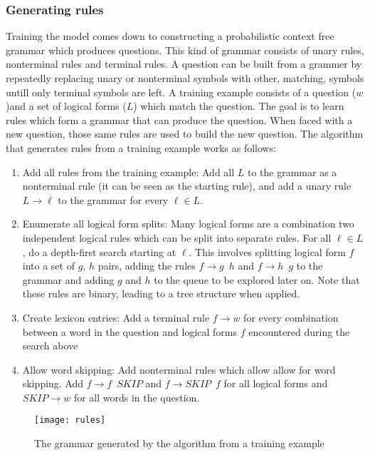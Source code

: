 \subsubsection{Generating rules}
Training the model comes down to constructing a probabilistic context free grammar which produces questions. This kind of grammar consists of unary rules, nonterminal rules and terminal rules. A question can be built from a grammer by repeatedly replacing unary or nonterminal symbols with other, matching, symbols untill only terminal symbols are left. A training example consists of a question ($w$)and a set of logical forms ($L$) which match the question. The goal is to learn rules which form a grammar that can produce the question. When faced with a new question, those same rules are used to build the new question. The algorithm that generates rules from a training example works as follows:
\begin{enumerate}
\item Add all rules from the training example: Add all $L$ to the grammar as a nonterminal rule (it can be seen as the starting rule), and add a unary rule $ L \rightarrow \ell $ to the grammar for every $\ell \in L$.
\item Enumerate all logical form splits: Many logical forms are a combination two independent logical rules which can be split into separate rules. For all $\ell \in L$, do a depth-first search starting at $\ell$. This involves splitting logical form $f$ into a set of $g,\, h$ pairs, adding the rules $ f \rightarrow g \enspace h$ and $ f \rightarrow h \enspace g$ to the grammar and adding $g$ and $h$ to the queue to be explored later on. Note that these rules are binary, leading to a tree structure when applied.
\item Create lexicon entries: Add a terminal rule $ f \rightarrow w$ for every combination between a word in the question and logical forms $f$ encountered during the search above
\item Allow word skipping: Add nonterminal rules which allow allow for word skipping. Add $ f \rightarrow f \enspace SKIP$ and $ f \rightarrow SKIP \enspace f$ for all logical forms and $ SKIP \rightarrow w$ for all words in the question.
\end{enumerate}

\begin{figure}[H]
\texttt{[image: rules]}
\caption{The grammar generated by the algorithm from a training example}\label{fig:rules}
\end{figure}

